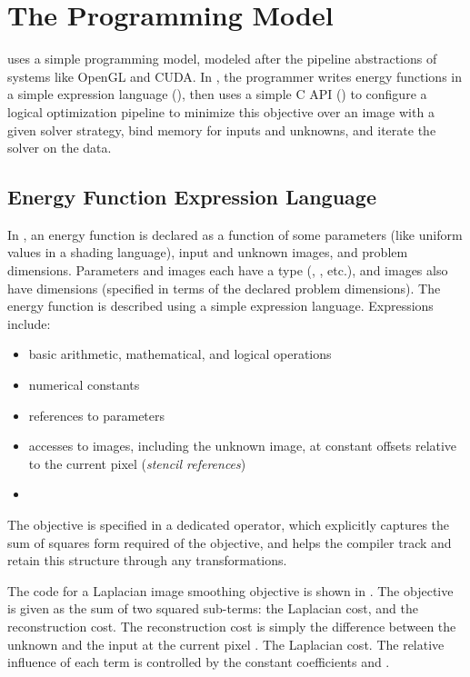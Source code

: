 \section{The \OPT Programming Model}
\label{sec:language}

\OPT uses a simple programming model, modeled after the pipeline abstractions of systems like OpenGL and CUDA. In \OPT, the programmer writes energy functions in a simple expression language (), then uses a simple C API () to configure a logical optimization pipeline to minimize this objective over an image with a given solver strategy, bind memory for inputs and unknowns, and iterate the solver on the data.
          
\subsection{Energy Function Expression Language} %
\label{sec:expression_language}

In \OPT, an energy function is declared as a function of some parameters (like uniform values in a shading language), input and unknown images, and problem dimensions. Parameters and images each have a type (, , etc.), and images also have dimensions (specified in terms of the declared problem dimensions).
The energy function is described using a simple expression language.
Expressions include:

\begin{itemize}
  \item basic arithmetic, mathematical, and logical operations
  \item numerical constants
  \item references to parameters
  \item accesses to images, including the unknown image, at constant offsets relative to the current pixel (\emph{stencil references})
  \item {}
\end{itemize}
%
The objective is specified in a dedicated  operator, which explicitly captures the sum of squares form required of the objective, and helps the compiler track and retain this structure through any transformations.

The \OPT code for a Laplacian image smoothing objective is shown in . The objective is given as the sum of two squared sub-terms: the Laplacian cost, and the reconstruction cost.
The reconstruction cost is simply the difference between the unknown  and the input  at the current pixel .
The Laplacian cost.
The relative influence of each term is controlled by the constant coefficients  and .

